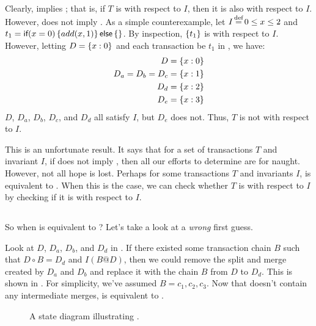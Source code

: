 Clearly, \iconfluence{} implies \liconfluence{}; that is, if $T$ is
\iconfluent{} with respect to $I$, then it is also \liconfluent{} with respect
to $I$. However, \liconfluence{} does not imply \iconfluence{}. As a simple
counterexample, let $I \defeq 0 \leq x \leq 2$ and $t_1 =
\textsf{if}(x=0)\left\{add(x,1)\right\}\textsf{else}\left\{\right\}$. By inspection, $\left\{t_1\right\}$ is \liconfluent{} with
respect to $I$. However, letting $D=\left\{x:0\right\}$ and each transaction be $t_1$ in
, we have:
\begin{align*}
  D   &= \left\{x:0\right\} \\
  D_a =
  D_b =
  D_c &= \left\{x:1\right\} \\
  D_d &= \left\{x:2\right\} \\
  D_e &= \left\{x:3\right\}
\end{align*}
$D$, $D_a$, $D_b$, $D_c$, and $D_d$ all satisfy $I$, but $D_e$ does not. Thus,
$T$ is not \iconfluent{} with respect to $I$.

This is an unfortunate result. It says that for a set of transactions $T$ and
invariant $I$, if \liconfluence{} does not imply \iconfluence{}, then all our
efforts to determine \liconfluence{} are for naught. However, not all hope is
lost. Perhaps for some transactions $T$ and invariants $I$, \liconfluence{} is
equivalent to \iconfluence{}. When this is the case, we can check whether $T$
is \iconfluent{} with respect to $I$ by checking if it is \liconfluent{} with
respect to $I$.

\subsection{\ireplayability{}}
So when is \liconfluence{} equivalent to \iconfluence{}? Let's take a look at a
\emph{wrong} first guess.

Look at $D$, $D_a$, $D_b$, and $D_d$ in . If there
existed some \imp{} transaction chain $B$ such that $D \circ B = D_d$ and
$I(B@D)$, then we could remove the split and merge created by $D_a$ and $D_b$
and replace it with the chain $B$ from $D$ to $D_d$. This is shown in
. For simplicity, we've assumed $B = c_1, c_2, c_3$. Now
that  doesn't contain any intermediate merges,
\liconfluence{} is equivalent to \iconfluence{}.

\begin{figure}[h]
  \centering
  \caption{A state diagram illustrating \iconfluence{}.}
  \label{fig:mergeremoved}
\end{figure}

